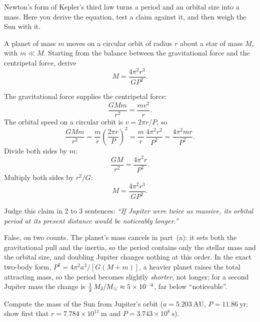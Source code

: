 
Newton's form of Kepler's third law turns a period and an orbital size into a mass.
Here you derive the equation, test a claim against it, and then weigh the Sun with it.

\parti A planet of mass $m$ moves on a circular orbit of radius $r$ about a star of mass $M$,
with $m \ll M$. Starting from the balance between the gravitational force and the centripetal
force, derive
\[
  M = \frac{4\pi^2 r^3}{G P^2}.
\]

\begin{solution}
The gravitational force supplies the centripetal force:
\[
  \frac{G M m}{r^2} = \frac{m v^2}{r}.
\]
The orbital speed on a circular orbit is $v = 2\pi r / P$, so
\[
  \frac{G M m}{r^2} = \frac{m}{r}\left(\frac{2\pi r}{P}\right)^{2}
                    = \frac{m}{r}\,\frac{4\pi^2 r^2}{P^2}
                    = \frac{4\pi^2 m r}{P^2}.
\]
Divide both sides by $m$:
\[
  \frac{G M}{r^2} = \frac{4\pi^2 r}{P^2}.
\]
Multiply both sides by $r^2/G$:
\[
  M = \frac{4\pi^2 r^3}{G P^2}.
\]
\end{solution}

\parti Judge this claim in 2 to 3 sentences: \emph{``If Jupiter were twice as massive, its
orbital period at its present distance would be noticeably longer.''}

\begin{solution}
False, on two counts. The planet's mass cancels in part~(a): it sets both the gravitational
pull and the inertia, so the period contains only the stellar mass and the orbital size, and
doubling Jupiter changes nothing at this order. In the exact two-body form,
$P^2 = 4\pi^2 a^3 / [G(M + m)]$, a heavier planet raises the total attracting mass, so the
period becomes slightly \emph{shorter}, not longer; for a second Jupiter mass the change is
$\tfrac{1}{2}\,M_{\mathsf{J}}/M_{\odot} \approx 5 \times 10^{-4}$, far below ``noticeable''.
\end{solution}

\parti Compute the mass of the Sun from Jupiter's orbit
($a = 5.203\ \mathrm{AU}$, $P = 11.86\ \mathrm{yr}$; show first that
$r = 7.784 \times 10^{11}\ \mathrm{m}$ and $P = 3.743 \times 10^{8}\ \mathrm{s}$).

